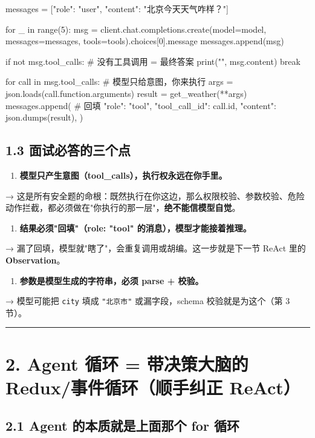 \begin{codeblock}
messages = [{"role": "user", "content": "北京今天天气咋样？"}]

for _ in range(5):
    msg = client.chat.completions.create(model=model, messages=messages, tools=tools).choices[0].message
    messages.append(msg)

    if not msg.tool_calls:           # 没有工具调用 = 最终答案
        print("", msg.content)
        break

    for call in msg.tool_calls:      # 模型只给意图，你来执行
        args = json.loads(call.function.arguments)
        result = get_weather(**args)
        messages.append({            # 回填
            "role": "tool",
            "tool_call_id": call.id,
            "content": json.dumps(result),
        })
\end{codeblock}

\subsection{1.3 面试必答的三个点}

\begin{enumerate}[leftmargin=2em]
\item \textbf{模型只产生意图（tool\_calls），执行权永远在你手里。}
\end{enumerate}
   → 这是所有安全题的命根：既然执行在你这边，那么权限校验、参数校验、危险动作拦截，都必须做在"你执行的那一层"，\textbf{绝不能信模型自觉}。
\begin{enumerate}[leftmargin=2em]
\item \textbf{结果必须"回填"（role: "tool" 的消息），模型才能接着推理。}
\end{enumerate}
   → 漏了回填，模型就"瞎了"，会重复调用或胡编。这一步就是下一节 ReAct 里的 \textbf{Observation}。
\begin{enumerate}[leftmargin=2em]
\item \textbf{参数是模型生成的字符串，必须 parse + 校验。}
\end{enumerate}
   → 模型可能把 \texttt{city} 填成 \texttt{"北京市"} 或漏字段，schema 校验就是为这个（第 3 节）。

\bigskip\hrule\bigskip

\section{2. Agent 循环 = 带决策大脑的 Redux/事件循环（顺手纠正 ReAct）}

\subsection{2.1 Agent 的本质就是上面那个 for 循环}


